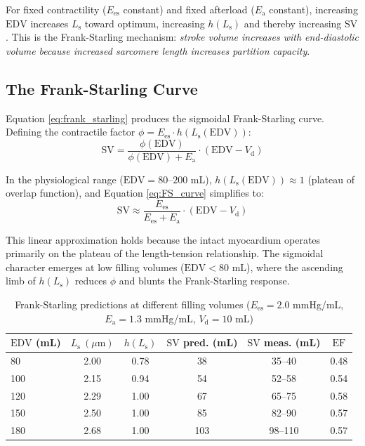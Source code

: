 \documentclass[10pt,twocolumn,a4paper]{article}
\theoremstyle{remark}
\newcommand{\Ees}{E_{\mathrm{es}}}
\newcommand{\Ea}{E_{\mathrm{a}}}
\newcommand{\Vd}{V_{\mathrm{d}}}
\newcommand{\SV}{\mathrm{SV}}
\newcommand{\EDV}{\mathrm{EDV}}
\newcommand{\EF}{\mathrm{EF}}
\newcommand{\Ls}{L_{\mathrm{s}}}
\begin{document}
For fixed contractility ($\Ees$ constant) and fixed afterload ($\Ea$ constant), increasing $\EDV$ increases $\Ls$ toward optimum, increasing $h(\Ls)$ and thereby increasing $\SV$. This is the Frank-Starling mechanism: \textit{stroke volume increases with end-diastolic volume because increased sarcomere length increases partition capacity}.

\subsection{The Frank-Starling Curve}

Equation \ref{eq:frank_starling} produces the sigmoidal Frank-Starling curve. Defining the contractile factor $\phi = \Ees \cdot h(\Ls(\EDV))$:
\begin{equation}
    \SV = \frac{\phi(\EDV)}{\phi(\EDV) + \Ea} \cdot (\EDV - \Vd)
    \label{eq:FS_curve}
\end{equation}

In the physiological range ($\EDV = 80$--$200$ mL), $h(\Ls(\EDV)) \approx 1$ (plateau of overlap function), and Equation \ref{eq:FS_curve} simplifies to:
\begin{equation}
    \SV \approx \frac{\Ees}{\Ees + \Ea} \cdot (\EDV - \Vd)
    \label{eq:FS_simple}
\end{equation}

This linear approximation holds because the intact myocardium operates primarily on the plateau of the length-tension relationship. The sigmoidal character emerges at low filling volumes ($\EDV < 80$ mL), where the ascending limb of $h(\Ls)$ reduces $\phi$ and blunts the Frank-Starling response.

\begin{table}[h]
\centering
\caption{Frank-Starling predictions at different filling volumes ($\Ees = 2.0$ mmHg/mL, $\Ea = 1.3$ mmHg/mL, $\Vd = 10$ mL)}
\label{tab:frank_starling}
\begin{tabular}{lccccc}
\toprule
$\EDV$ (mL) & $\Ls~(\mu\mathrm{m})$ & $h(\Ls)$ & $\SV$ pred. (mL) & $\SV$ meas. (mL) & $\EF$ \\
\midrule
80 & 2.00 & 0.78 & 38 & 35--40 & 0.48 \\
100 & 2.15 & 0.94 & 54 & 52--58 & 0.54 \\
120 & 2.29 & 1.00 & 67 & 65--75 & 0.58 \\
150 & 2.50 & 1.00 & 85 & 82--90 & 0.57 \\
180 & 2.68 & 1.00 & 103 & 98--110 & 0.57 \\
\bottomrule
\end{tabular}
\end{table}
\end{document}
